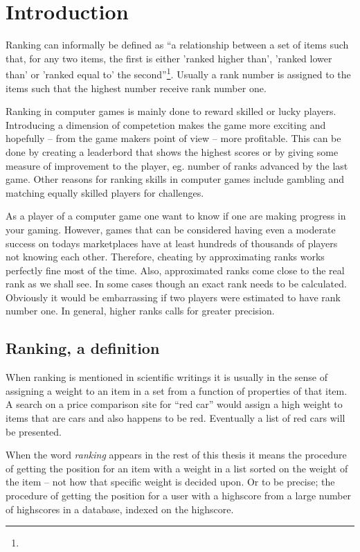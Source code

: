 \chapter{Introduction}

Ranking can informally be defined as ``a relationship between a set of items such that, for any two items, the first is either 'ranked higher than', 'ranked lower than' or 'ranked equal to' the second''\footnote{}. Usually a rank number is assigned to the items such that the highest number receive rank number one.

Ranking in computer games is mainly done to reward skilled or lucky players. Introducing a dimension of competetion makes the game more exciting and hopefully -- from the game makers point of view -- more profitable. This can be done by creating a leaderbord that shows the highest scores or by giving some measure of improvement to the player, eg. number of ranks advanced by the last game. Other reasons for ranking skills in computer games include gambling and matching equally skilled players for challenges.

As a player of a computer game one want to know if one are making progress in your gaming. However, games that can be considered having even a moderate success on todays marketplaces have at least hundreds of thousands of players not knowing each other. Therefore, cheating by approximating ranks works perfectly fine most of the time. Also, approximated ranks come close to the real rank as we shall see. In some cases though an exact rank needs to be calculated. Obviously it would be embarrassing if two players were estimated to have rank number one. In general, higher ranks calls for greater precision.

\section{Ranking, a definition}

When ranking is mentioned in scientific writings it is usually in the sense of assigning a weight to an item in a set from a function of properties of that item. A search on a price comparison site for ``red car'' would assign a high weight to items that are cars and also happens to be red. Eventually a list of red cars will be presented.

When the word \emph{ranking} appears in the rest of this thesis it means the procedure of getting the position for an item with a weight in a list sorted on the weight of the item -- not how that specific weight is decided upon. Or to be precise; the procedure of getting the position for a user with a highscore from a large number of highscores in a database, indexed on the highscore.

